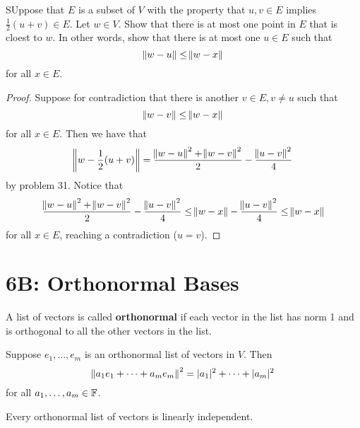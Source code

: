 \documentclass{extarticle}
\begin{document}
\begin{problem}{32}
    SUppose that \(E\) is a subset of \(V\) with the property that \(u, v \in E\) implies 
    \(\frac{1}{2}(u+v) \in E\). Let \(w \in V\). Show that there is at most one point in \(E\) 
    that is cloest to \(w\). In other words, show that there is at most one \(u \in E\) such that 
    \[\norm{w - u} \leq \norm{w - x}\] 
    for all \(x \in E\).
\end{problem}

\begin{proof}
Suppose for contradiction that there is another \(v \in E, v \neq u\) such that 
\[\norm{w - v} \leq \norm{w - x}\]
for all \(x \in E\). Then we have that 
\[\norm{w - \frac{1}{2}(u+v)} = \frac{\norm{w - u}^2 + \norm{w - v}^2}{2} - \frac{\norm{u-v}^2}{4}\]
by problem 31. Notice that 
\[\frac{\norm{w - u}^2 + \norm{w - v}^2}{2} - \frac{\norm{u-v}^2}{4} \leq \norm{w - x} -  
\frac{\norm{u-v}^2}{4} \leq \norm{w - x}\]
for all \(x \in E\), reaching a contradiction (\(u = v\)). 
\end{proof}







\newpage 
\section*{6B: Orthonormal Bases}


\begin{definition}[orthonormal]
    A list of vectors is called \textbf{orthonormal} if each vector in the list has norm 1 and 
    is orthogonal to all the other vectors in the list.
\end{definition}

\begin{corollary}
    Suppose \(e_1, \ldots, e_m\) is an orthonormal list of vectors in \(V\). Then 
    \[\norm{a_1 e_1 + \cdots + a_m e_m}^2 = |a_1|^2 + \cdots + |a_m|^2\]
    for all \(a_1, \ldots, a_m \in \mathbb{F}\).
\end{corollary}

\begin{corollary}
    Every orthonormal list of vectors is linearly independent. 
\end{corollary}
\end{document}
